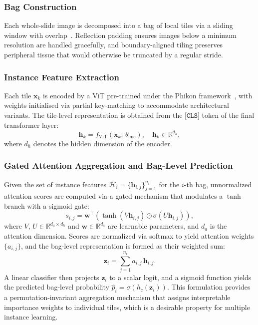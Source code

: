 \documentclass[journal,twoside,web]{ieeecolor}
\begin{document}
\subsubsection{Bag Construction}

Each whole-slide image is decomposed into a bag of local tiles via a sliding window with overlap~\cite{campanella2019clinical,lu2021data}. Reflection 
padding ensures images below a minimum resolution are handled gracefully, and boundary-aligned tiling preserves peripheral tissue that would otherwise be truncated by a regular stride.

\subsubsection{Instance Feature Extraction}
Each tile $\mathbf{x}_k$ is encoded by a ViT pre-trained under the Phikon framework~\cite{filiot2023scaling}, with weights initialised via partial key-matching to accommodate architectural variants. The tile-level representation is obtained from the \(\texttt{[CLS]}\) token of the final 
transformer layer:
\begin{equation*}
    \mathbf{h}_k = f_{\text{ViT}}(\mathbf{x}_k;\,\theta_{\text{enc}}),
    \quad \mathbf{h}_k \in \mathbb{R}^{d_h},
\end{equation*}
where $d_h$ denotes the hidden dimension of the encoder.

\subsubsection{Gated Attention Aggregation and Bag-Level Prediction}
\label{sec:gated_attention}
Given the set of instance features $\mathcal{H}_i = \{\mathbf{h}_{i,j}\}_{j=1}^{n_i}$ for the $i$-th bag, unnormalized attention scores are computed via a gated mechanism that modulates a $\tanh$ branch with a sigmoid gate:
\begin{equation*}
    s_{i,j} = \mathbf{w}^{\top}
    \!\left(\tanh\!\left(V\mathbf{h}_{i,j}\right) \odot
    \sigma\!\left(U\mathbf{h}_{i,j}\right)\right),
\end{equation*}
where $V,\,U \in \mathbb{R}^{d_a \times d_h}$ and $\mathbf{w} \in \mathbb{R}^{d_a}$ are learnable parameters, and $d_a$ is the attention dimension. Scores are normalized via softmax to yield attention weights $\{a_{i,j}\}$, and the bag-level representation is formed as their weighted sum:
\begin{equation*}
    \mathbf{z}_i = \sum_{j=1}^{n_i} a_{i,j}\,\mathbf{h}_{i,j}.
\end{equation*}
A linear classifier then projects $\mathbf{z}_i$ to a scalar logit, and a sigmoid function yields the predicted bag-level probability $\hat{p}_i = \sigma\!\left(h_{\mathrm{c}}(\mathbf{z}_i)\right)$. This formulation provides a permutation-invariant aggregation mechanism that assigns interpretable importance weights to individual tiles, which is a desirable property for multiple instance learning.
\end{document}
